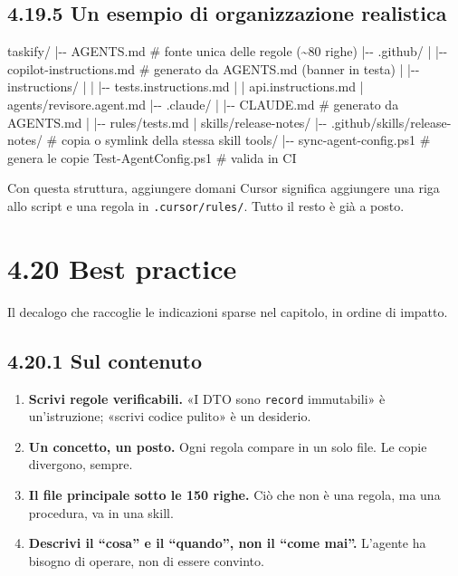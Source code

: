 \documentclass[
  italian,
  10pt,
]{book}
\newenvironment{Shaded}{\begin{snugshade}}{\end{snugshade}}
\newcommand{\NormalTok}[1]{#1}
\providecommand{\tightlist}{%
  \setlength{\itemsep}{0pt}\setlength{\parskip}{0pt}}
\begin{document}
\subsection{4.19.5 Un esempio di organizzazione
realistica}\label{un-esempio-di-organizzazione-realistica}

\begin{Shaded}
\begin{Highlighting}[]
\NormalTok{taskify/}
\NormalTok{|{-}{-} AGENTS.md                    \# fonte unica delle regole (\textasciitilde{}80 righe)}
\NormalTok{|{-}{-} .github/}
\NormalTok{|   |{-}{-} copilot{-}instructions.md  \# generato da AGENTS.md (banner in testa)}
\NormalTok{|   |{-}{-} instructions/}
\NormalTok{|   |   |{-}{-} tests.instructions.md}
\NormalTok{|   |   \textasciigrave{}{-}{-} api.instructions.md}
\NormalTok{|   \textasciigrave{}{-}{-} agents/revisore.agent.md}
\NormalTok{|{-}{-} .claude/}
\NormalTok{|   |{-}{-} CLAUDE.md                \# generato da AGENTS.md}
\NormalTok{|   |{-}{-} rules/tests.md}
\NormalTok{|   \textasciigrave{}{-}{-} skills/release{-}notes/}
\NormalTok{|{-}{-} .github/skills/release{-}notes/ \# copia o symlink della stessa skill}
\NormalTok{\textasciigrave{}{-}{-} tools/}
\NormalTok{    |{-}{-} sync{-}agent{-}config.ps1     \# genera le copie}
\NormalTok{    \textasciigrave{}{-}{-} Test{-}AgentConfig.ps1      \# valida in CI}
\end{Highlighting}
\end{Shaded}

Con questa struttura, aggiungere domani Cursor significa aggiungere una
riga allo script e una regola in \texttt{.cursor/rules/}. Tutto il resto
è già a posto.

\section{4.20 Best practice}\label{best-practice}

Il decalogo che raccoglie le indicazioni sparse nel capitolo, in ordine
di impatto.

\subsection{4.20.1 Sul contenuto}\label{sul-contenuto}

\begin{enumerate}
\def\labelenumi{\arabic{enumi}.}
\tightlist
\item
  \textbf{Scrivi regole verificabili.} «I DTO sono \texttt{record}
  immutabili» è un'istruzione; «scrivi codice pulito» è un desiderio.
\item
  \textbf{Un concetto, un posto.} Ogni regola compare in un solo file.
  Le copie divergono, sempre.
\item
  \textbf{Il file principale sotto le 150 righe.} Ciò che non è una
  regola, ma una procedura, va in una skill.
\item
  \textbf{Descrivi il ``cosa'' e il ``quando'', non il ``come mai''.}
  L'agente ha bisogno di operare, non di essere convinto.
\end{enumerate}
\end{document}
